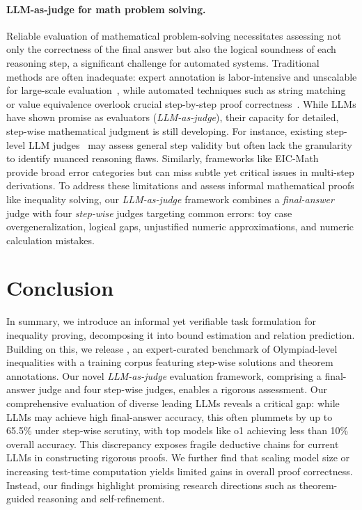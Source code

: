 \paragraph{LLM-as-judge for math problem solving.}
Reliable evaluation of mathematical problem-solving necessitates assessing not only the correctness of the final answer but also the logical soundness of each reasoning step, a significant challenge for automated systems. Traditional methods are often inadequate: expert annotation is labor-intensive and unscalable for large-scale evaluation~\cite{petrov2025prooforbluff, mao-etal-2024-champ}, while automated techniques such as string matching or value equivalence overlook crucial step-by-step proof correctness~\cite{hendrycks2021measuring,gulati2024putnamaxiom, liu2024livemathbench,lu2024mathvista}. While LLMs have shown promise as evaluators (\textit{LLM-as-judge}), their capacity for detailed, step-wise mathematical judgment is still developing. For instance, existing step-level LLM judges~\cite{DBLP:reasoneval, gao2025omnimath} may assess general step validity but often lack the granularity to identify nuanced reasoning flaws. Similarly, frameworks like EIC-Math~\cite{li2024evaluating} provide broad error categories but can miss subtle yet critical issues in multi-step derivations. To address these limitations and assess informal mathematical proofs like inequality solving, our \textit{LLM-as-judge} framework combines a \textit{final-answer} judge with four \textit{step-wise} judges targeting common errors: toy case overgeneralization, logical gaps, unjustified numeric approximations, and numeric calculation mistakes.

\vspace{-3mm}
\section{Conclusion}
\label{sec:conclusion}
\vspace{-3mm}

In summary, we introduce an informal yet verifiable task formulation for inequality proving, decomposing it into bound estimation and relation prediction. Building on this, we release \dataset, an expert-curated benchmark of Olympiad-level inequalities with a training corpus featuring step-wise solutions and theorem annotations. Our novel \textit{LLM-as-judge} evaluation framework, comprising a final-answer judge and four step-wise judges, enables a rigorous assessment. Our comprehensive evaluation of diverse leading LLMs reveals a critical gap: while LLMs may achieve high final-answer accuracy, this often plummets by up to 65.5\% under step-wise scrutiny, with top models like o1 achieving less than 10\% overall accuracy. This discrepancy exposes fragile deductive chains for current LLMs in constructing rigorous proofs. We further find that scaling model size or increasing test-time computation yields limited gains in overall proof correctness. Instead, our findings highlight promising research directions such as theorem-guided reasoning and self-refinement.


